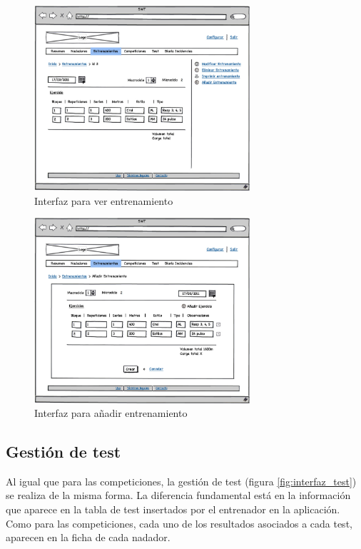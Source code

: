 		\begin{figure}[H]
		  \centering
		    \includegraphics[width=8cm]{./eps/20_Entrenamientos_show.eps}
		  \caption{Interfaz para ver entrenamiento}
		  \label{fig:interfaz_competiciones_show}
		\end{figure}
	
		\begin{figure}[H]
		  \centering
		    \includegraphics[width=8cm]{./eps/19_Entrenamientos_new.eps}
		  \caption{Interfaz para añadir entrenamiento}
		  \label{fig:interfaz_entrenamientos_new}
		\end{figure}

	
	\subsection{Gestión de test} %
		\label{sub:gestion_de_test}
	
	Al igual que para las competiciones, la gestión de test (figura \ref{fig:interfaz_test}) se realiza de la misma forma. La diferencia fundamental está en la información que aparece en la tabla de test insertados por el entrenador en la aplicación. Como para las competiciones, cada uno de los resultados asociados a cada test, aparecen en la ficha de cada nadador.
	

